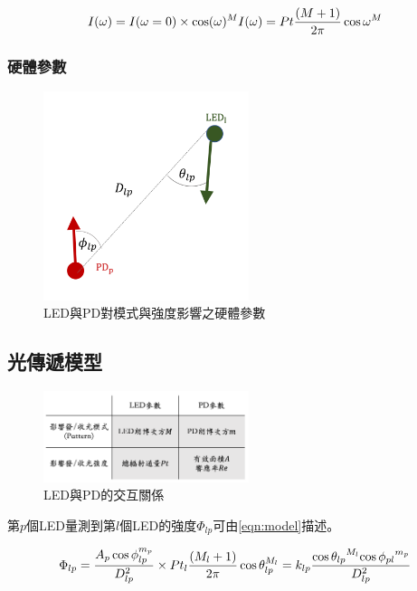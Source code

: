         \begin{equation}
            I(\omega)=I(\omega=0)\times\cos(\omega)^{M}\\
            I(\omega)=Pt\frac{(M+1)}{2 \pi} \cos \omega^{M}
        \end{equation}

        \subsubsection{硬體參數}

        \begin{figure}[ht]
            \caption{LED與PD對模式與強度影響之硬體參數}
            \label{tab:hardwarepara}
            \centering
            \includegraphics[width=6cm]{00temppic/7.png}
        \end{figure}

        

    \subsection{光傳遞模型}
    
    \begin{figure}[ht]
        \caption{LED與PD的交互關係}
        \centering
        \includegraphics[width=6cm]{ch2pic/tab_hardwarepara.png}
    \end{figure}

    第$p$個LED量測到第$l$個LED的強度$\Phi_{lp}$可由\ref{eqn:model}描述。
    
    \begin{equation}
        \label{eqn:model}
        \Phi_{lp}=\frac{ A_p\cos\phi_{lp}^{m_{p}} }{D^2_{lp}}\times Pt_l\frac{(M_{l}+1)}{2 \pi} \cos \theta_{lp}^{M_{l}}  \\
        =k_{lp}\frac{{\cos\theta_{lp}}^{M_{l}}{\cos\phi_{pl}}^{m_{p}}}{D_{lp}^2}\\
    \end{equation}

